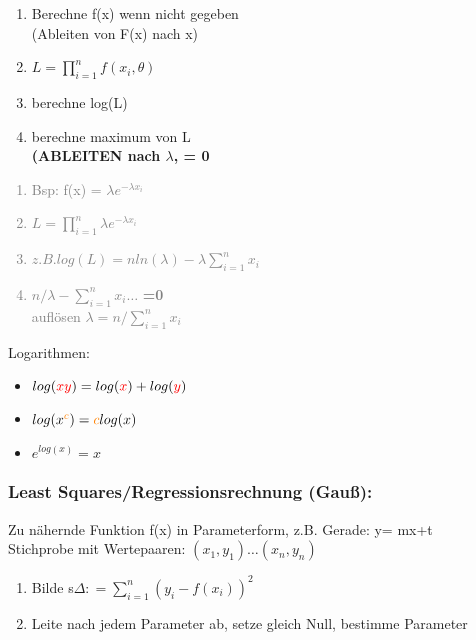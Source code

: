 \begin{minipage}{0.25\textwidth}
\begin{enumerate}
\item Berechne f(x) wenn nicht gegeben \\(Ableiten von F(x) nach x)
\item $L = \prod_{i=1}^n f(x_i,\theta)$
\item berechne log(L) 
\item berechne maximum von L \\\textbf{(ABLEITEN nach $\lambda$, = 0 } 
\end{enumerate}
\end{minipage}
\begin{minipage}{0.25\textwidth}
\textcolor{gray}{
\begin{enumerate}
\item Bsp: f(x) = $\lambda e^ {-\lambda x_i}$\\
\item $ L = \prod_{i=1}^n \lambda e^ {-\lambda x_i}$
\item $	z.B. log(L) = n ln(\lambda) -\lambda \sum_{i=1}^n x_i $
\item $n/\lambda - \sum_{i=1}^n x_i \dots$ \textbf{=0}\\
auflösen $\lambda = n/ \sum_{i=1}^n x_i$
\end{enumerate}}
\end{minipage}

\newcommand{\bc}{\textcolor{orange}{c}}
\newcommand{\red}[1]{\textcolor{red}{#1}}

Logarithmen:
\begin{itemize}
\item $log(\red{xy}) = log(\red{x}) + log(\red{y})$
\item $log(x^{\bc}) = \bc log(x)$
\item $e^{log(x)} = x$
\end{itemize}

\newpage

\subsubsection*{Least Squares/Regressionsrechnung (Gauß):}
Zu nähernde Funktion f(x) in Parameterform, z.B. Gerade: y= mx+t\\
Stichprobe mit Wertepaaren: $(x_1,y_1)\dots (x_n,y_n)$

\begin{enumerate}
\item Bilde s$\Delta : = \sum_{i=1}^n(y_i - f(x_i))^2$
\item Leite nach jedem Parameter ab, setze gleich Null, bestimme Parameter
\end{enumerate}

